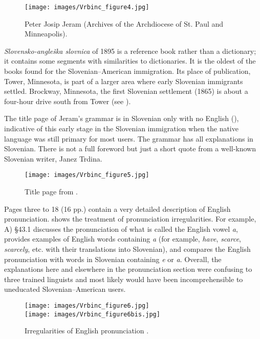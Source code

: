 \documentclass[output=paper,colorlinks,citecolor=brown,arabicfont,chinesefont]{langscibook}
\begin{document}
\begin{figure}
\texttt{[image: images/Vrbinc\_figure4.jpg]}
\caption{Peter Josip Jeram (Archives of the Archdiocese of St. Paul and Minneapolis).}
\label{vrbinc:fig4}
\end{figure}

 \emph{Slovensko-angleška slovnica} of 1895 is a reference book rather than a dictionary; it contains some segments with similarities to dictionaries. It is the oldest of the books found for the Slovenian–American immigration. Its place of publication, Tower, Minnesota, is part of a larger area where early Slovenian immigrants settled. Brockway, Minnesota, the first Slovenian settlement (1865) is about a four-hour drive south from Tower (see ).

The title page of Jeram’s grammar is in Slovenian only with no English (), indicative of this early stage in the Slovenian immigration when the native language was still primary for most users. The grammar has all explanations in Slovenian. There is not a full foreword but just a short quote from a well-known Slovenian writer, Janez Trdina.

\begin{figure}
\texttt{[image: images/Vrbinc\_figure5.jpg]}
\caption{Title page from \citealt{Jeram1895}.}
\label{vrbinc:fig5}
\end{figure}

Pages three to 18 (16 pp.) contain a very detailed description of English pronunciation.  shows the treatment of pronunciation irregularities. For example, A) §43.1 discusses the pronunciation of what is called the English vowel \emph{a}, provides examples of English words containing \emph{a} (for example, \emph{have}, \emph{scarce}, \emph{scarcely}, etc. with their translations into Slovenian), and compares the English pronunciation with words in Slovenian containing \emph{e} or \emph{a}. Overall, the explanations here and elsewhere in the pronunciation section were confusing to three trained linguists and most likely would have been incomprehensible to uneducated Slovenian–American users.


\begin{figure}
\texttt{[image: images/Vrbinc\_figure6.jpg]}\\
\texttt{[image: images/Vrbinc\_figure6bis.jpg]}
\caption{Irregularities of English pronunciation \citep[13--14]{Jeram1895}.}
\label{vrbinc:fig6}
\end{figure}
\end{document}
